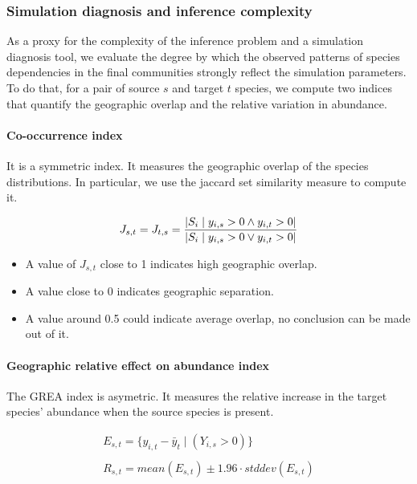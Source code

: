 \documentclass[]{article}
\begin{document}
\subsubsection{Simulation diagnosis and inference complexity}
As a proxy for the complexity of the inference problem and a simulation diagnosis tool, we evaluate the degree by which the observed patterns of species dependencies in the final communities strongly reflect the simulation parameters. To do that, for a pair of source $s$ and target $t$ species, we compute two indices that quantify the geographic overlap  and the relative variation in abundance.  

\paragraph{Co-occurrence index} 
It is a symmetric index. It measures the geographic overlap of the species distributions. In particular, we use the jaccard set similarity measure to compute it.

\begin{equation*}
J_{s,t} = J_{t,s} = \dfrac{|{S_i \mid y_{i,s}>0 \land y_{i,t}>0}|}{|{S_i \mid y_{i,s}>0 \lor y_{i,t}>0}|} \\\\
\end{equation*}

\begin{itemize}
	\item A value of $J_{s,t}$ close to 1 indicates high geographic overlap. 
	\item A value close to 0 indicates geographic separation.
	\item A value around 0.5 could indicate average overlap, no conclusion can be made out of it. 
\end{itemize}

\paragraph{Geographic relative effect on abundance index}
The GREA index is asymetric. It measures the relative increase in the target species' abundance when the source species is present. 

\begin{equation*}
\begin{matrix}
E_{s,t} = \{ y_{i,t} - \bar{y}_{t}   \mid (Y_{i,s}>0) \} \\\\ 
R_{s,t} =  mean(E_{s,t}) \pm 1.96 \cdot stddev(E_{s,t}) \\
\end{matrix}
\end{equation*}
\end{document}
